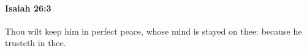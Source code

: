 
		\paragraph{Isaiah 26:3} %
			\label{ISAIAH-26-3}

			Thou wilt keep him in perfect peace, whose mind is stayed on thee: because he trusteth in thee.


